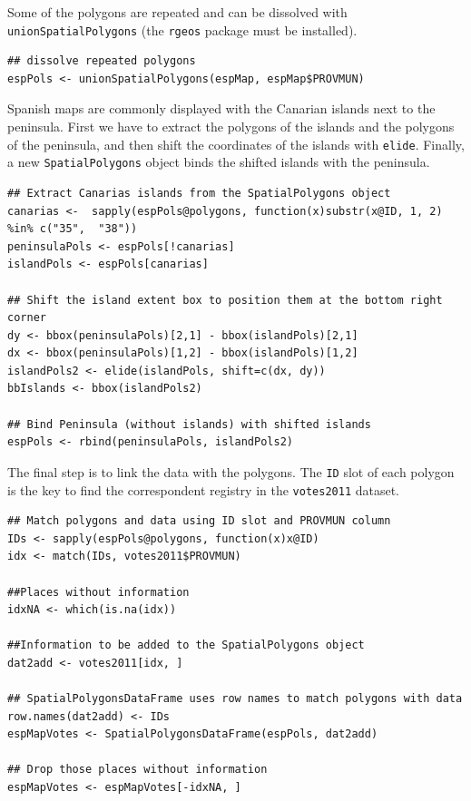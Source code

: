 \documentclass[smallroyalvopaper]{memoir}
\begin{document}
Some of the polygons are repeated and can be dissolved with
\texttt{unionSpatialPolygons} (the \texttt{rgeos} package must be installed).
\lstset{language=R,numbers=none}
\begin{lstlisting}
## dissolve repeated polygons
espPols <- unionSpatialPolygons(espMap, espMap$PROVMUN)
\end{lstlisting}

Spanish maps are commonly displayed with the Canarian islands next
to the peninsula. First we have to extract the polygons of the
islands and the polygons of the peninsula, and then shift the
coordinates of the islands with \texttt{elide}. Finally, a new
\texttt{SpatialPolygons} object binds the shifted islands with the
peninsula.

\lstset{language=R,numbers=none}
\begin{lstlisting}
## Extract Canarias islands from the SpatialPolygons object
canarias <-  sapply(espPols@polygons, function(x)substr(x@ID, 1, 2) %in% c("35",  "38"))
peninsulaPols <- espPols[!canarias]
islandPols <- espPols[canarias]

## Shift the island extent box to position them at the bottom right corner
dy <- bbox(peninsulaPols)[2,1] - bbox(islandPols)[2,1]
dx <- bbox(peninsulaPols)[1,2] - bbox(islandPols)[1,2]
islandPols2 <- elide(islandPols, shift=c(dx, dy))
bbIslands <- bbox(islandPols2)

## Bind Peninsula (without islands) with shifted islands
espPols <- rbind(peninsulaPols, islandPols2)
\end{lstlisting}

The final step is to link the data with the polygons. The \texttt{ID} slot of
each polygon is the key to find the correspondent registry in the
\texttt{votes2011} dataset.
\lstset{language=R,numbers=none}
\begin{lstlisting}
## Match polygons and data using ID slot and PROVMUN column
IDs <- sapply(espPols@polygons, function(x)x@ID)
idx <- match(IDs, votes2011$PROVMUN)

##Places without information
idxNA <- which(is.na(idx))

##Information to be added to the SpatialPolygons object
dat2add <- votes2011[idx, ]

## SpatialPolygonsDataFrame uses row names to match polygons with data
row.names(dat2add) <- IDs
espMapVotes <- SpatialPolygonsDataFrame(espPols, dat2add)

## Drop those places without information
espMapVotes <- espMapVotes[-idxNA, ]
\end{lstlisting}
\end{document}
